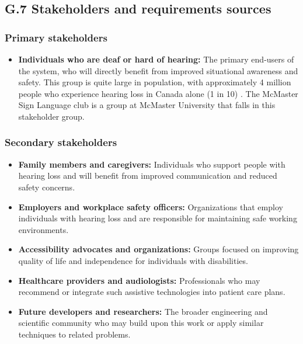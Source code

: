 \documentclass[12pt]{article}
\theoremstyle{definition}
\begin{document}
\subsection{G.7 Stakeholders and requirements sources}

\subsubsection{Primary stakeholders}

\begin{itemize}
\item \textbf{Individuals who are deaf or hard of hearing:}
\label{stakeholder:hardHearing} The primary end-users of the system, who will
directly benefit from improved situational awareness and safety. This group is
quite large in population, with approximately 4 million people who experience
hearing loss in Canada alone (1 in 10) \cite{Healthing2025}.
The McMaster Sign Language club is a
group at McMaster University that falls in this stakeholder group.

\end{itemize}

\subsubsection{Secondary stakeholders}

\begin{itemize}
\item \textbf{Family members and caregivers:} Individuals who support people
with hearing loss and will benefit from improved communication and reduced
safety concerns.

\item \textbf{Employers and workplace safety officers:} Organizations that
employ individuals with hearing loss and are responsible for maintaining safe
working environments.

\item \textbf{Accessibility advocates and organizations:} Groups focused on
improving quality of life and independence for individuals with disabilities.

\item \textbf{Healthcare providers and audiologists:} Professionals who may
recommend or integrate such assistive technologies into patient care plans.

\item \textbf{Future developers and researchers:} The broader engineering and
scientific community who may build upon this work or apply similar techniques to
related problems.
\end{itemize}
\end{document}
